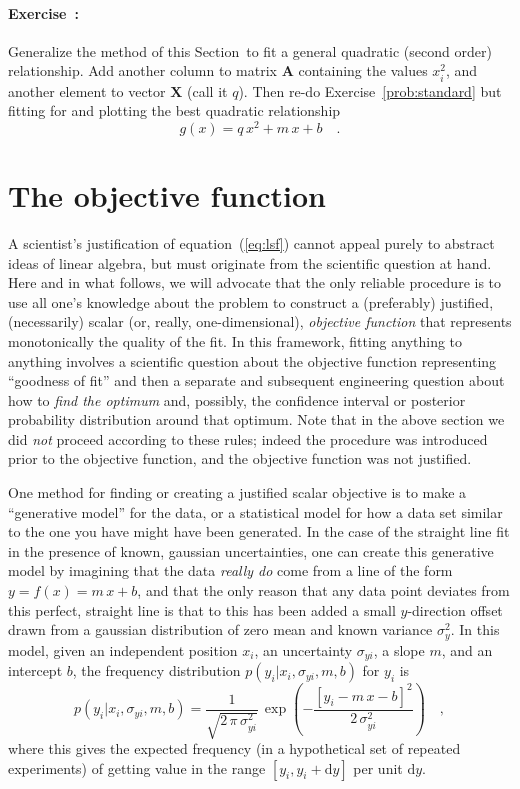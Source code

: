 \documentclass[12pt]{article}
\newcommand{\sectionname}{Section}
\newcommand{\equationname}{equation}
\newcommand{\problemname}{Exercise}
\newcounter{problem}
\newenvironment{problem}{\paragraph{\problemname~\theproblem:}\refstepcounter{problem}}{}
\newcommand{\mmatrix}[1]{\boldsymbol{#1}}
\newcommand{\mA}{\mmatrix{A}}
\newcommand{\mX}{\mmatrix{X}}
\renewcommand{\d}{\mathrm{d}}
\begin{document}
\begin{problem}\label{prob:quadratic}
Generalize the method of this \sectionname\ to fit a general quadratic
(second order) relationship.  Add another column to matrix $\mA$
containing the values $x_i^2$, and another element to vector $\mX$
(call it $q$).  Then re-do \problemname~\ref{prob:standard} but
fitting for and plotting the best quadratic relationship
\begin{equation}
g(x) = q\,x^2 + m\,x + b \quad.
\end{equation}
\end{problem}

\section{The objective function}\label{sec:objective}

A scientist's justification of \equationname~(\ref{eq:lsf}) cannot
appeal purely to abstract ideas of linear algebra, but must originate
from the scientific question at hand.  Here and in what follows, we
will advocate that the only reliable procedure is to use all one's
knowledge about the problem to construct a (preferably) justified,
(necessarily) scalar (or, really, one-dimensional), \emph{objective
  function} that represents monotonically the quality of the fit.  In
this framework, fitting anything to anything involves a scientific
question about the objective function representing ``goodness of fit''
and then a separate and subsequent engineering question about how to
\emph{find the optimum} and, possibly, the confidence interval or
posterior probability distribution around that optimum.  Note that in
the above section we did \emph{not} proceed according to these rules;
indeed the procedure was introduced prior to the objective function,
and the objective function was not justified.

One method for finding or creating a justified scalar objective is to
make a ``generative model'' for the data, or a statistical model for
how a data set similar to the one you have might have been generated.
In the case of the straight line fit in the presence of known,
gaussian uncertainties, one can create this generative model by
imagining that the data \emph{really do} come from a line of the form
$y = f(x) = m\,x+b$, and that the only reason that any data point
deviates from this perfect, straight line is that to this has been
added a small $y$-direction offset drawn from a gaussian distribution
of zero mean and known variance $\sigma_y^2$.  In this model, given an
independent position $x_i$, an uncertainty $\sigma_{yi}$, a slope $m$,
and an intercept $b$, the frequency distribution
$p(y_i|x_i,\sigma_{yi},m,b)$ for $y_i$ is
\begin{equation}
p(y_i|x_i,\sigma_{yi},m,b) = \frac{1}{\sqrt{2\,\pi\,\sigma_{yi}^2}}
 \,\exp\left(-\frac{[y_i - m\,x - b]^2}{2\,\sigma_{yi}^2}\right) \quad ,
\end{equation}
where this gives the expected frequency (in a hypothetical set of
repeated experiments) of getting value in the range $[y_i,y_i+\d y]$
per unit $\d y$.
\end{document}
